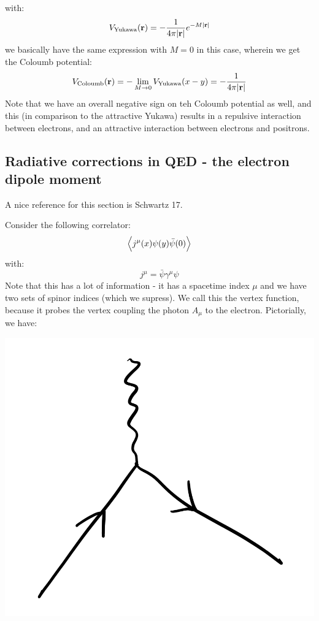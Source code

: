 with:
\begin{equation}
    V_{\text{Yukawa}}(\mathbf{r}) = -\frac{1}{4\pi\lvert \mathbf{r} \rvert}e^{-M\lvert \mathbf{r} \rvert}
\end{equation}
we basically have the same expression with $M = 0$ in this case, wherein we get the Coloumb potential:
\begin{equation}
    V_{\text{Coloumb}}(\mathbf{r}) = -\lim_{M \to 0}V_{\text{Yukawa}}(x - y) = -\frac{1}{4\pi\lvert \mathbf{r} \rvert}
\end{equation}
Note that we have an overall negative sign on teh Coloumb potential as well, and this (in comparison to the attractive Yukawa) results in a repulsive interaction between electrons, and an attractive interaction between electrons and positrons.

\subsection{Radiative corrections in QED - the electron dipole moment}
A nice reference for this section is Schwartz 17.

Consider the following correlator:
\begin{equation}
    \left< j^\mu(x)\psi(y)\bar{\psi}(0) \right>
\end{equation}
with:
\begin{equation}
    j^\mu = \bar{\psi}\gamma^\mu \psi
\end{equation}
Note that this has a lot of information - it has a spacetime index $\mu$ and we have two sets of spinor indices (which we supress). We call this the vertex function, because it probes the vertex coupling the photon $A_\mu$ to the electron. Pictorially, we have:

\begin{center}
    \includegraphics[scale=0.35]{Lectures/Images/lec9-diagram.png}
\end{center}

